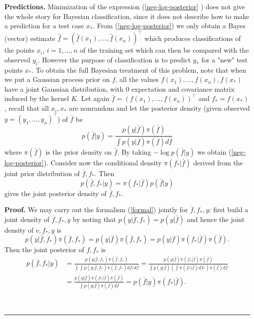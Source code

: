 \documentclass[11pt,twoside]{article}%
\theoremstyle{change}
\newenvironment{proof}[1][Proof]{\textbf{#1.} }{\ \rule{0.5em}{0.5em}}
\begin{document}
\textbf{Predictions. } Minimization of the expression (\ref{neg-log-posterior}%
) does not give the whole story for Bayesian classification, since it does not
describe how to make a prediction for a test case $x_{\ast}$. From
(\ref{neg-log-posterior}) we only obtain a Bayes (vector) estimate $\hat
{f}=\left(  \hat{f}(x_{1}),\ldots,\hat{f}(x_{n})\right)  ^{\top}$ which
produces classifications of the points $x_{i}$, $i=1,\ldots,n$ of the training
set which can then be compared with the observed $y_{i}$. However the purpose
of classification is to predict $y_{\ast}$ for a "new" test points $x_{\ast}$.
To obtain the full Bayesian treatment of this problem, note that when we put a
Gaussian process prior on $f$, all the values $f(x_{1}),\ldots,f(x_{n}%
),f(x_{\ast})$ have a joint Gaussian distribution, with $0$ expectation and
covariance matrix induced by the kernel $K$. Let again $\bar{f}=\left(
f(x_{1}),\ldots,f(x_{n})\right)  ^{\top}$ and $f_{\ast}=f(x_{\ast})$, recall
that all $x_{i},x_{\ast}$ are nonrandom and let the posterior density (given
observed $y=\left(  y_{1},\ldots,y_{n}\right)  ^{\top}$) of $\bar{f}$ be
\begin{equation}
p\left(  \bar{f}|y\right)  =\frac{p\left(  y|\bar{f}\right)  \pi(\bar{f}%
)}{\int p\left(  y|\bar{f}\right)  \pi(\bar{f})d\bar{f}}\label{formal}%
\end{equation}
where $\pi(\bar{f})$ is the prior density on $\bar{f}$. By taking $-\log
p\left(  \bar{f}|y\right)  $ we obtain (\ref{neg-log-posterior}). Consider now
the conditional density $\pi(f_{\ast}|\bar{f})$ derived from the joint prior
distribution of $\bar{f},f_{\ast}$. Then
\[
p\left(  \bar{f},f_{\ast}|y\right)  =\pi(f_{\ast}|\bar{f})p\left(  \bar
{f}|y\right)
\]
gives the joint posterior density of $\bar{f},f_{\ast}$. \bigskip\bigskip

\begin{proof}
We may carry out the formalism (\ref{formal}) jointly for $\bar{f},f_{\ast}%
,y$: first build a joint density of $\bar{f},f_{\ast},y$ by noting that
$p\left(  y|\bar{f},f_{\ast}\right)  =p\left(  y|\bar{f}\right)  $ and hence
the joint density of $v,f_{\ast},y$ is
\[
p\left(  y|\bar{f},f_{\ast}\right)  \pi\left(  \bar{f},f_{\ast}\right)
=p\left(  y|\bar{f}\right)  \pi\left(  \bar{f},f_{\ast}\right)  =p\left(
y|\bar{f}\right)  \pi(f_{\ast}|\bar{f})\pi(\bar{f}).
\]
Then the joint posterior of $f,f_{\ast}$ is
\begin{align*}
p\left(  \bar{f},f_{\ast}|y\right)   & =\frac{p\left(  y|\bar{f},f_{\ast
}\right)  \pi\left(  \bar{f},f_{\ast}\right)  }{\int\int p\left(  y|\bar
{f},f_{\ast}\right)  \pi\left(  \bar{f},f_{\ast}\right)  df_{\ast}d\bar{f}%
}=\frac{p\left(  y|\bar{f}\right)  \pi(f_{\ast}|\bar{f})\pi(\bar{f})}{\int
p\left(  y|\bar{f}\right)  \left(  \int\pi(f_{\ast}|\bar{f})df_{\ast}\right)
\pi(\bar{f})d\bar{f}}\\
& =\frac{p\left(  y|\bar{f}\right)  \pi(f_{\ast}|\bar{f})\pi(\bar{f})}{\int
p\left(  y|\bar{f}\right)  \pi(\bar{f})d\bar{f}}=p\left(  \bar{f}|y\right)
\pi(f_{\ast}|\bar{f}).
\end{align*}

\end{proof}
\end{document}
